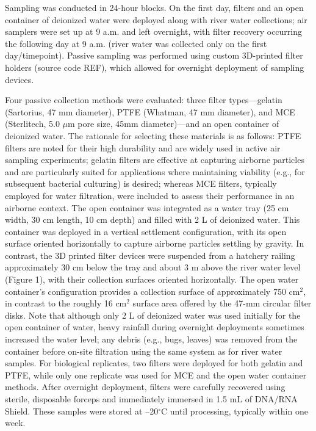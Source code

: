 \documentclass{article}
\begin{document}
Sampling was conducted in 24-hour blocks. On the first day, filters and an open container of deionized water were deployed along with river water collections; air samplers were set up at 9 a.m. and left overnight, with filter recovery occurring the following day at 9 a.m. (river water was collected only on the first day/timepoint). Passive sampling was performed using custom 3D-printed filter holders (source code REF), which allowed for overnight deployment of sampling devices.

Four passive collection methods were evaluated: three filter types—gelatin (Sartorius, 47 mm diameter), PTFE (Whatman, 47 mm diameter), and MCE (Sterlitech, 5.0 $\mu$m pore size, 45mm diameter)—and an open container of deionized water. The rationale for selecting these materials is as follows: PTFE filters are noted for their high durability and are widely used in active air sampling experiments; gelatin filters are effective at capturing airborne particles and are particularly suited for applications where maintaining viability (e.g., for subsequent bacterial culturing) is desired; whereas MCE filters, typically employed for water filtration, were included to assess their performance in an airborne context. The open container was integrated as a water tray (25 cm width, 30 cm length, 10 cm depth) and filled with 2 L of deionized water. This container was deployed in a vertical settlement configuration, with its open surface oriented horizontally to capture airborne particles settling by gravity. In contrast, the 3D printed filter devices were suspended from a hatchery railing approximately 30 cm below the tray and about 3 m above the river water level (Figure 1), with their collection surfaces oriented horizontally. The open water container’s configuration provides a collection surface of approximately 750 cm$^2$, in contrast to the roughly 16 cm$^2$ surface area offered by the 47-mm circular filter disks. Note that although only 2 L of deionized water was used initially for the open container of water, heavy rainfall during overnight deployments sometimes increased the water level; any debris (e.g., bugs, leaves) was removed from the container before on-site filtration using the same system as for river water samples. For biological replicates, two filters were deployed for both gelatin and PTFE, while only one replicate was used for MCE and the open water container methods. After overnight deployment, filters were carefully recovered using sterile, disposable forceps and immediately immersed in 1.5 mL of DNA/RNA Shield. These samples were stored at –20$^\circ$C until processing, typically within one week.
\end{document}
